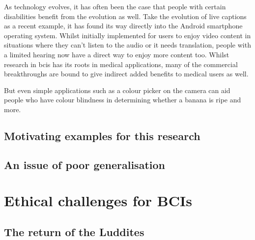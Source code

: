 
As technology evolves, it has often been the case that people with certain disabilities benefit from the evolution as well.
Take the evolution of live captions as a recent example, it has found its way directly into the Android smartphone operating system.
Whilst initially implemented for users to enjoy video content in situations where they can't listen to the audio or it needs translation, people with a limited hearing now have a direct way to enjoy more content too.
Whilst research in \glspl{bci} has its roots in medical applications, many of the commercial breakthroughs are bound to give indirect added benefits to medical users as well.

But even simple applications such as a colour picker on the camera can aid people who have colour blindness in determining whether a banana is ripe and more.


\subsection{Motivating examples for this research}
\label{subsec:bci_small_projects_motivating_examples}

\lipsum[1-4]


\subsection{An issue of poor generalisation}
\label{subsec:bci_small_projects_lack_of_testing}

\lipsum[1-2]


\section{Ethical challenges for BCIs}
\label{sec:bci_ethical}

\lipsum[1-2]


\subsection{The return of the Luddites}
\label{subsec:bci_ethical_luddites}

\lipsum[1-3]

